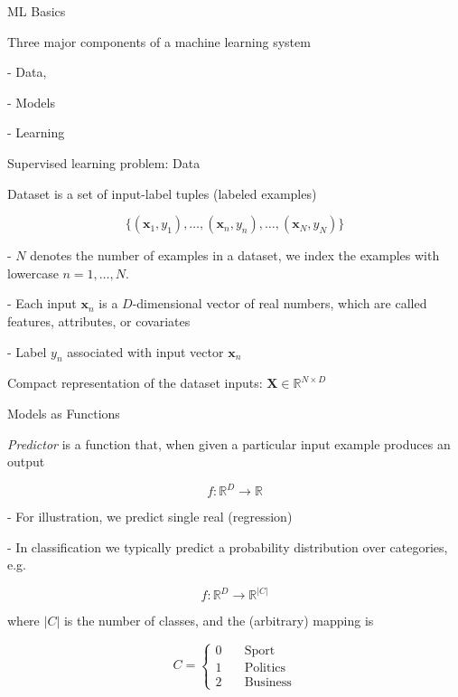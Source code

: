 \documentclass[12pt]{beamer}
\begin{document}
\begin{frame}{ML Basics}
	
Three major components of a machine learning system
	
- Data,

- Models

- Learning
	
	
\end{frame}

\begin{frame}{Supervised learning problem: Data}

Dataset is a set of input-label tuples (labeled examples)

$$
\{(\mathbf{x}_1, y_1), \dots,  (\mathbf{x}_n, y_n), \dots,  (\mathbf{x}_N, y_N)\}
$$

- $N$ denotes the number of examples in a dataset, we index the examples with lowercase $n = 1, \dots, N$.

\bigskip

- Each input $\mathbf{x}_n$ is a $D$-dimensional vector of real numbers, which are called features, attributes, or covariates

- Label $y_n$ associated with input vector $\mathbf{x}_n$

Compact representation of the dataset inputs: $\mathbf{X} \in \mathbb{R}^{N \times D}$
	
\end{frame}

\begin{frame}{Models as Functions}

\emph{Predictor} is a function that, when given a particular input example produces an output

$$
f: \mathbb{R}^{D} \to \mathbb{R}
$$

- For illustration, we predict single real (regression)

- In classification we typically predict a probability distribution over categories, e.g.

$$
f: \mathbb{R}^{D} \to \mathbb{R}^{|C|}
$$

where $|C|$ is the number of classes, and the (arbitrary) mapping is

$$
C =
\begin{cases}
0  & \quad \text{Sport}\\
1  & \quad \text{Politics}\\
2  & \quad \text{Business}
\end{cases}
$$

\end{frame}
\end{document}
